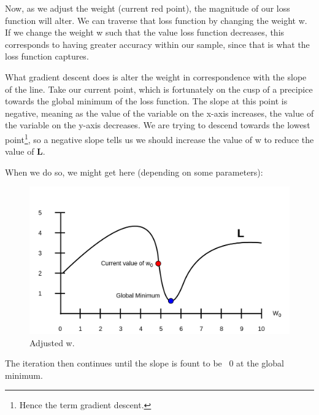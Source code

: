\documentclass[a4paper, 12pt]{article}
\begin{document}
                        \par Now, as we adjust the weight (current red point), the magnitude of our loss function will alter. We can traverse that loss function by changing the weight w. If we change the weight w such that the value loss function decreases, this corresponds to having greater accuracy within our sample, since that is what the loss function captures.
                        
                        \par What gradient descent does is alter the weight in correspondence with the slope of the line. Take our current point, which is fortunately on the cusp of a precipice towards the global minimum of the loss function. The slope at this point is negative, meaning as the value of the variable on the x-axis increases, the value of the variable on the y-axis decreases. We are trying to descend towards the lowest point\footnote{Hence the term gradient descent.}, so a negative slope tells us we should increase the value of w to reduce the value of \textbf{L}.
                        
                        \par When we do so, we might get here (depending on some parameters):
                        
                        \begin{figure}[h]
                            \caption{Adjusted w.}
                            \centering
                            \includegraphics[width=\textwidth]{lossFunction1}
                        \end{figure}
                        
                        \par The iteration then continues until the slope is fount to be ~0 at the global minimum.
                        
\end{document}
